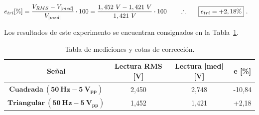       \begin{align*}
        e_{tri} [\%] = \dfrac{V_{RMS} - V_{|med|}}{V_{|med|}} \cdot 100
               = \dfrac{1,452~V - 1,421~V}{1,421~V} \cdot 100
               \hspace{20pt} \therefore \hspace{20pt} \Aboxed{e_{tri}= +2,18\%}~.
      \end{align*}

    Los resultados de este experimento se encuentran consignados en la
    Tabla~\ref{tab:MedicionesOndasCuadYTrian}.
  
    \begin{table}[H] \centering
      \begin{tabular}{|c|c|c|c|} \hline
        \textbf{Señal}     & \textbf{Lectura RMS [V]}  & \textbf{Lectura |med| [V]} & \textbf{e [\%]} \\ \hline
      $\mathbf{Cuadrada~(50~Hz - 5~V_{pp})}$    & 2,450     & 2,748         &  -10,84        \\ \hline
      $\mathbf{Triangular~(50~Hz - 5~V_{pp})}$  & 1,452      & 1,421        &  +2,18         \\ \hline
      \end{tabular}
      \caption{Tabla de mediciones y cotas de corrección.}
      \label{tab:MedicionesOndasCuadYTrian}
    \end{table}
